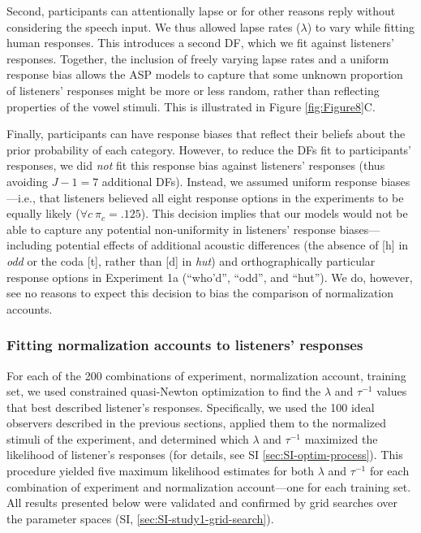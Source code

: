 \documentclass[preprint]{JASA}
\begin{document}
Second, participants can attentionally lapse or for other reasons reply without considering the speech input. We thus allowed lapse rates (\(\lambda\)) to vary while fitting human responses. This introduces a second DF, which we fit against listeners' responses. Together, the inclusion of freely varying lapse rates and a uniform response bias allows the ASP models to capture that some unknown proportion of listeners' responses might be more or less random, rather than reflecting properties of the vowel stimuli. This is illustrated in Figure \ref{fig:Figure8}C.

Finally, participants can have response biases that reflect their beliefs about the prior probability of each category. However, to reduce the DFs fit to participants' responses, we did \emph{not} fit this response bias against listeners' responses (thus avoiding \(J - 1 = 7\) additional DFs). Instead, we assumed uniform response biases---i.e., that listeners believed all eight response options in the experiments to be equally likely (\(\forall c\ \pi_c = .125\)). This decision implies that our models would not be able to capture any potential non-uniformity in listeners' response biases---including potential effects of additional acoustic differences (the absence of {[}h{]} in \emph{odd} or the coda {[}t{]}, rather than {[}d{]} in \emph{hut}) and orthographically particular response options in Experiment 1a (``who'd'', ``odd'', and ``hut''). We do, however, see no reasons to expect this decision to bias the comparison of normalization accounts.

\subsubsection{Fitting normalization accounts to listeners' responses}\label{sec:fitting-accounts}

For each of the 200 combinations of experiment, normalization account, training set, we used constrained quasi-Newton optimization \citep[as implemented in \texttt{R}'s \texttt{optim()} function]{byrd1995} to find the \(\lambda\) and \(\tau^{-1}\) values that best described listener's responses. Specifically, we used the 100 ideal observers described in the previous sections, applied them to the normalized stimuli of the experiment, and determined which \(\lambda\) and \(\tau^{-1}\) maximized the likelihood of listener's responses (for details, see SI \ref{sec:SI-optim-process}). This procedure yielded five maximum likelihood estimates for both \(\lambda\) and \(\tau^{-1}\) for each combination of experiment and normalization account---one for each training set. All results presented below were validated and confirmed by grid searches over the parameter spaces (SI, \ref{sec:SI-study1-grid-search}).
\end{document}
